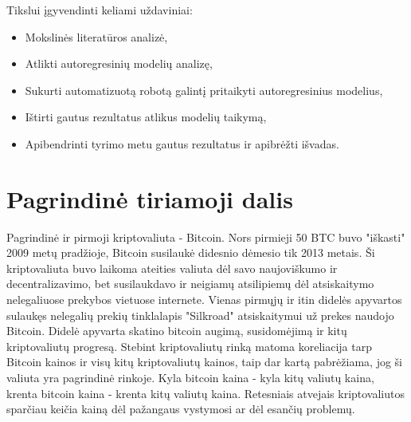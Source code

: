 \documentclass{VUMIFInfKursinis}
\begin{document}
Tikslui įgyvendinti keliami uždaviniai:
\begin{itemize}
  \item Mokslinės literatūros analizė, %
  \item Atlikti autoregresinių modelių analizę, %
  \item Sukurti automatizuotą robotą galintį pritaikyti autoregresinius modelius,
  \item Ištirti gautus rezultatus atlikus modelių taikymą, %
  \item Apibendrinti tyrimo metu gautus rezultatus ir apibrėžti išvadas.
\end{itemize}


\section{Pagrindinė tiriamoji dalis}
Pagrindinė ir pirmoji kriptovaliuta - Bitcoin. Nors pirmieji 50 BTC buvo "iškasti" 2009 metų pradžioje, Bitcoin susilaukė didesnio dėmesio
tik 2013 metais\cite{macdonell2014popping}. Ši kriptovaliuta buvo laikoma ateities valiuta dėl savo naujoviškumo ir decentralizavimo, bet susilaukdavo ir 
neigiamų atsilipiemų dėl atsiskaitymo nelegaliuose prekybos vietuose internete. 
Vienas pirmųjų ir itin didelės apyvartos sulaukęs nelegalių prekių tinklalapis "Silkroad" atsiskaitymui už prekes naudojo Bitcoin.
Didelė apyvarta skatino bitcoin augimą, susidomėjimą ir kitų kriptovaliutų progresą.
Stebint kriptovaliutų rinką matoma koreliacija tarp Bitcoin kainos ir visų kitų kriptovaliutų kainos, taip dar kartą pabrėžiama, jog ši valiuta yra pagrindinė rinkoje.
Kyla bitcoin kaina - kyla kitų valiutų kaina, krenta bitcoin kaina - krenta kitų valiutų kaina. Retesniais atvejais kriptovaliutos sparčiau keičia kainą dėl 
pažangaus vystymosi ar dėl esančių problemų. 
\end{document}
